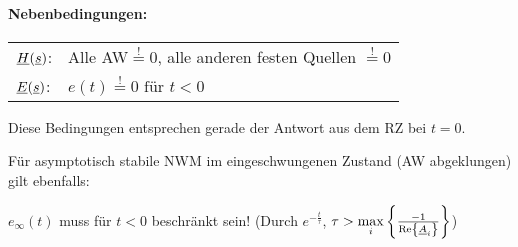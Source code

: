   \begin{minipage}{0.45\textwidth}
  \end{minipage}
  \hfill
  \begin{minipage}{0.5\textwidth}
  \paragraph{Nebenbedingungen:}
    \begin{tabularx}{\textwidth}{lX}
      $\underline{H}(\underline{s})$:
        & Alle AW$\stackrel{!}{=}0$, \newline
          alle anderen festen Quellen $\stackrel{!}{=}0$ \\
      $\underline{E}(\underline{s})$:
        & $e(t)\stackrel{!}{=}0\text{ für } t<0$
    \end{tabularx}\medskip

    Diese Bedingungen entsprechen gerade der Antwort aus dem \acs{RZ} bei $t=0$.
  \end{minipage}

Für asymptotisch stabile NWM im eingeschwungenen Zustand (AW abgeklungen)
gilt ebenfalls:

  \begin{minipage}{0.45\textwidth}
  \end{minipage}
  \hfill
  \begin{minipage}{0.5\textwidth}
    $e_\infty(t)$ muss für $t<0$ beschränkt sein!
    (Durch $e^{-\frac t\tau}$, $\tau >\underset{i}{\operatorname{max}}
      \left\{\frac{-1}{\operatorname{Re}\left\{\underline{A}_i\right\}}\right\}$)
  \end{minipage}

